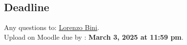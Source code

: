 \subsection*{Deadline}
Any questions to: \href{mailto:Lorenzo.Bini@unige.ch}{Lorenzo Bini}.\\
Upload on Moodle due by : \textbf{March 3, 2025 at 11:59 pm}.
